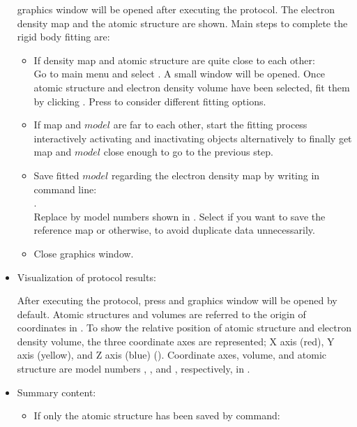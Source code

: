 \begin{itemize}
  \chimera graphics window will be opened after executing the protocol. The electron density map and the atomic structure are shown. Main steps to complete the rigid body fitting are:
  \begin{itemize}
   \item If density map and atomic structure are quite close to each other:\\Go to \chimera main menu and select . A small  window will be opened. Once atomic structure and electron density volume have been selected, fit them by clicking . Press  to consider different fitting options.
   \item If map and $model$ are far to each other, start the fitting process interactively activating and inactivating \chimera objects alternatively to finally get map and $model$ close enough to go to the previous step. 
   \item Save fitted $model$ regarding the electron density map by writing in \chimera command line:\\ .\\Replace {} by model numbers shown in \chimera {}. Select  if you want to save the reference map or  otherwise, to avoid duplicate data unnecessarily.
   \item Close \chimera graphics window.
  \end{itemize}
  
  \item Visualization of protocol results:
  
    After executing the protocol, press  and \chimera graphics window will be opened by default. Atomic structures and volumes are referred to the origin of coordinates in \chimera. To show the relative position of atomic structure and electron density volume, the three coordinate axes are represented; X axis (red), Y axis (yellow), and Z axis (blue) (). Coordinate axes, volume, and atomic structure are model numbers , , and , respectively, in \chimera {}.
   
  \item Summary content:
   \begin{itemize}
    \item If only the atomic structure has been saved by  command:


\end{itemize}
\end{itemize}
